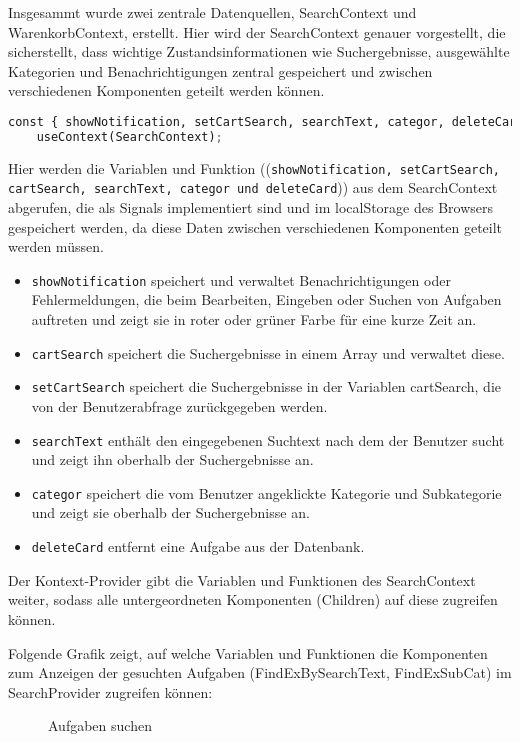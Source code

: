 Insgesammt wurde zwei zentrale Datenquellen, SearchContext und WarenkorbContext, erstellt. Hier wird der SearchContext genauer vorgestellt, die sicherstellt, dass wichtige Zustandsinformationen wie Suchergebnisse, ausgewählte Kategorien und Benachrichtigungen zentral gespeichert und zwischen verschiedenen Komponenten geteilt werden können. 


\begin{lstlisting}[language=Python]
  const { showNotification, setCartSearch, searchText, categor, deleteCard } =
    useContext(SearchContext);
 \end{lstlisting}  
 
Hier werden die Variablen und Funktion ((\texttt{showNotification, setCartSearch, cartSearch, searchText, categor und deleteCard})) aus dem SearchContext abgerufen, die als Signals implementiert sind und im localStorage des Browsers gespeichert werden, da diese Daten zwischen verschiedenen Komponenten geteilt werden müssen.

\begin{itemize}
  \item \texttt{showNotification} speichert und verwaltet Benachrichtigungen oder Fehlermeldungen, die beim Bearbeiten, Eingeben oder Suchen von Aufgaben auftreten und zeigt sie in roter oder grüner Farbe für eine kurze Zeit an.
  \item \texttt{cartSearch} speichert die Suchergebnisse in einem Array und verwaltet diese.
    \item \texttt{setCartSearch} speichert die Suchergebnisse in der Variablen cartSearch, die von der Benutzerabfrage zurückgegeben werden.
    \item \texttt{searchText} enthält den eingegebenen Suchtext nach dem der Benutzer sucht und zeigt ihn oberhalb der Suchergebnisse an.
    \item \texttt{categor} speichert die vom Benutzer angeklickte Kategorie und Subkategorie und zeigt sie oberhalb der Suchergebnisse an.
    \item \texttt{deleteCard} entfernt eine Aufgabe aus der Datenbank.
  
\end{itemize}


Der Kontext-Provider gibt die Variablen und Funktionen des SearchContext weiter, sodass alle untergeordneten Komponenten (Children) auf diese zugreifen können.

Folgende Grafik zeigt, auf welche Variablen und Funktionen die Komponenten zum Anzeigen der gesuchten Aufgaben (FindExBySearchText, FindExSubCat) im SearchProvider zugreifen können:
\begin{figure}[ht]
\caption{Aufgaben suchen \cite{fig:suchen}}
\end{figure}


